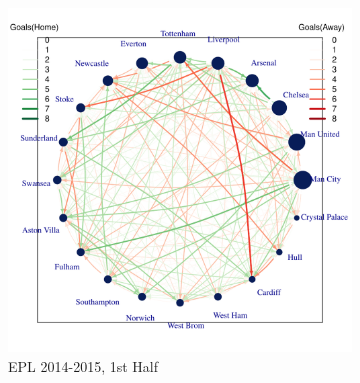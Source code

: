 \documentclass[12pt,a4paper,twoside,openany]{book}
\makeatletter
\def\maxwidth{ %
  \ifdim\Gin@nat@width>\linewidth
    \linewidth
  \else
    \Gin@nat@width
  \fi
}
\newenvironment{knitrout}{}{} %
\makeatother
\begin{document}
\begin{figure}[H]
\hspace*{\fill}
\begin{subfigure}{0.40\textwidth}
\begin{knitrout}
\color{fgcolor}

{\centering \includegraphics[width=\maxwidth]{figure/unnamed-chunk-5-1} 

}



\end{knitrout}
\caption{EPL 2014-2015, 1st Half}
\end{subfigure}\hspace*{\fill}
\begin{subfigure}{0.4\textwidth}
\begin{knitrout}
\color{fgcolor}


\end{knitrout}
\end{subfigure}
\end{figure}
\end{document}
